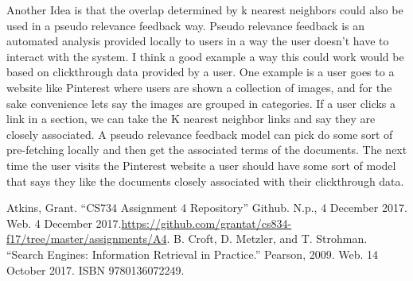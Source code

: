 \documentclass[letterpaper,11pt]{article}
\begin{document}
Another Idea is that the overlap determined by k nearest neighbors could also be used in a pseudo relevance feedback way.
Pseudo relevance feedback is an automated analysis provided locally to users in a way the user doesn't have to interact with the system.
I think a good example a way this could work would be based on clickthrough data provided by a user.
One example is a user goes to a website like Pinterest where users are shown a collection of images, and for the sake convenience lets say the images are grouped in categories.
If a user clicks a link in a section, we can take the K nearest neighbor links and say they are closely associated.
A pseudo relevance feedback model can pick do some sort of pre-fetching locally and then get the associated terms of the documents.
The next time the user visits the Pinterest website a user should have some sort of model that says they like the documents closely associated with their clickthrough data.


\clearpage


\clearpage



\begin{thebibliography}{9}
Atkins, Grant. ``CS734 Assignment 4 Repository'' Github. N.p., 4 December 2017. Web. 4 December 2017.\url{https://github.com/grantat/cs834-f17/tree/master/assignments/A4}.
B. Croft, D. Metzler, and T. Strohman. ``Search Engines: Information Retrieval in Practice.'' Pearson, 2009. Web. 14 October 2017. ISBN 9780136072249.
\end{thebibliography}
\end{document}
